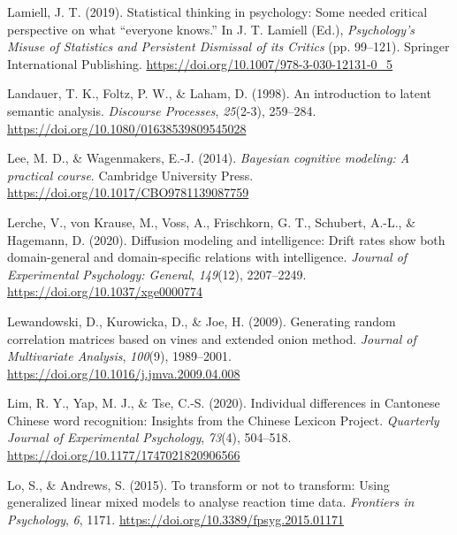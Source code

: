 \documentclass[
  12pt,
  man,floatsintext]{apa7}
\newlength{\cslhangindent}
\newlength{\cslentryspacingunit} %
\newenvironment{CSLReferences}[2] %
 {%
  \setlength{\parindent}{0pt}
  \ifodd #1
  \let\oldpar\par
  \def\par{\hangindent=\cslhangindent\oldpar}
  \fi
  \setlength{\parskip}{#2\cslentryspacingunit}
 }%
 {}
\begin{document}
\begin{CSLReferences}{1}{0}
\leavevmode{}%
Lamiell, J. T. (2019). Statistical thinking in psychology: Some needed critical perspective on what {``everyone knows.''} In J. T. Lamiell (Ed.), \emph{Psychology's {Misuse} of {Statistics} and {Persistent Dismissal} of its {Critics}} (pp. 99--121). {Springer International Publishing}. \url{https://doi.org/10.1007/978-3-030-12131-0_5}

\leavevmode{}%
Landauer, T. K., Foltz, P. W., \& Laham, D. (1998). An introduction to latent semantic analysis. \emph{Discourse Processes}, \emph{25}(2-3), 259--284. \url{https://doi.org/10.1080/01638539809545028}

\leavevmode{}%
Lee, M. D., \& Wagenmakers, E.-J. (2014). \emph{Bayesian cognitive modeling: {A} practical course}. {Cambridge University Press}. \url{https://doi.org/10.1017/CBO9781139087759}

\leavevmode{}%
Lerche, V., von Krause, M., Voss, A., Frischkorn, G. T., Schubert, A.-L., \& Hagemann, D. (2020). Diffusion modeling and intelligence: {Drift} rates show both domain-general and domain-specific relations with intelligence. \emph{Journal of Experimental Psychology: General}, \emph{149}(12), 2207--2249. \url{https://doi.org/10.1037/xge0000774}

\leavevmode{}%
Lewandowski, D., Kurowicka, D., \& Joe, H. (2009). Generating random correlation matrices based on vines and extended onion method. \emph{Journal of Multivariate Analysis}, \emph{100}(9), 1989--2001. \url{https://doi.org/10.1016/j.jmva.2009.04.008}

\leavevmode{}%
Lim, R. Y., Yap, M. J., \& Tse, C.-S. (2020). Individual differences in {Cantonese Chinese} word recognition: {Insights} from the {Chinese Lexicon Project}. \emph{Quarterly Journal of Experimental Psychology}, \emph{73}(4), 504--518. \url{https://doi.org/10.1177/1747021820906566}

\leavevmode{}%
Lo, S., \& Andrews, S. (2015). To transform or not to transform: Using generalized linear mixed models to analyse reaction time data. \emph{Frontiers in Psychology}, \emph{6}, 1171. \url{https://doi.org/10.3389/fpsyg.2015.01171}


\end{CSLReferences}
\end{document}
